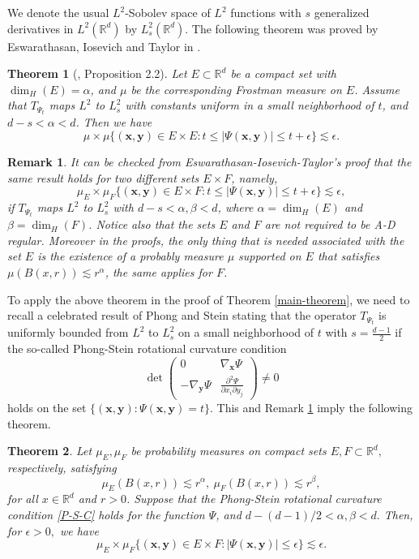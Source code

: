 \documentclass[11pt]{article}
\newtheorem{theorem}{Theorem}[section]
\newtheorem{remark}{Remark}[section]
\newcommand{\1}{\mathbf{1}}
\begin{document}
We denote the usual $L^2$-Sobolev space of $L^2$ functions with $s$ generalized derivatives in $L^2(\mathbb{R}^d)$ by $L^2_s(\mathbb{R}^d)$. The following theorem was proved by Eswarathasan, Iosevich and Taylor in \cite{Alex}.
\begin{theorem} [\cite{Alex}, Proposition 2.2]
Let $E\subset \mathbb{R}^d$ be a compact set with $\dim_H(E)=\alpha$, and $\mu$ be the corresponding Frostman measure on $E$. Assume that $T_{\Psi_t}$ maps $L^2$ to $L^2_s$ with constants uniform in a small neighborhood of $t$, and $ d-s < \alpha < d$. Then we have
$$\mu \times \mu \{(\mathbf{x}, \mathbf{y}) \in E \times E : t \leq |\Psi(\mathbf{x},\mathbf{y})| \leq t+ \epsilon\} \lesssim \epsilon.$$

\end{theorem}

\begin{remark}\label{remarks}
It can be checked from Eswarathasan-Iosevich-Taylor's proof that the same result holds for two different sets $E \times F$, namely,
\begin{equation*}\mu_E \times \mu_F \{(\mathbf{x}, \mathbf{y}) \in E \times F : t \leq |\Psi(\mathbf{x},\mathbf{y})| \leq t+\epsilon\} \lesssim \epsilon,\end{equation*}
if  $T_{\Psi_t}$ maps $L^2$ to $L^2_s$ with $ d-s < \alpha, \beta < d$, where $\alpha=\dim_H(E)$ and $\beta=\dim_H(F)$. Notice also that the sets $E$ and $F$ are not required to be A-D regular. Moreover in the proofs, the only thing that is needed associated with the set $E$ is the existence of a probably measure $\mu$ supported on $E$ that satisfies $\mu(B(x, r)) \lesssim r^{\alpha}$, the same applies for $F$.
\end{remark}
To apply the above theorem in the proof of Theorem \ref{main-theorem}, we need to recall a celebrated result of Phong and Stein \cite{PhS} stating that the operator $T_{\Psi_t}$ is uniformly bounded from $L^2$ to $L^2_s$ on a small neighborhood of $t$ with $s= \frac{d-1}{2}$ if the so-called Phong-Stein rotational curvature condition 
\begin{equation}\label{P-S-C}\det \begin{pmatrix}
0 & \nabla_\mathbf{x}\Psi \\
-\nabla_\mathbf{y}\Psi & \frac{\partial^2 \Psi}{\partial x_i \partial y_j} 
\end{pmatrix} \ne 0\end{equation} 
holds on the set $\{(\mathbf{x}, \mathbf{y})\colon \Psi(\mathbf{x},\mathbf{y})=t\}$. This and Remark \ref{remarks} imply the following theorem. 
\begin{theorem}\label{2.1.1}
Let $\mu_E, \mu_F$ be probability measures on  compact sets $E, F \subset \mathbb R^d,$ respectively, satisfying 
\[\mu_E(B(x, r))\lesssim r^\alpha, ~\mu_F(B(x, r))\lesssim r^\beta,\]
for all $x\in \mathbb{R}^d$ and $r>0$. Suppose that the Phong-Stein rotational curvature condition \eqref{P-S-C} holds for the function $\Psi$, and $d-(d-1)/2 < \alpha, \beta <d.$ Then, for $\epsilon>0,$  we have
$$\mu_E \times \mu_F \{(\mathbf{x}, \mathbf{y}) \in E \times F : |\Psi(\mathbf{x},\mathbf{y})| \leq \epsilon\} \lesssim \epsilon.$$
\end{theorem}
\end{document}

